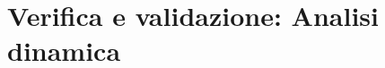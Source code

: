 \documentclass[../main]{subfiles}
\begin{document}
\section{Verifica e validazione: Analisi dinamica}
\end{document}
